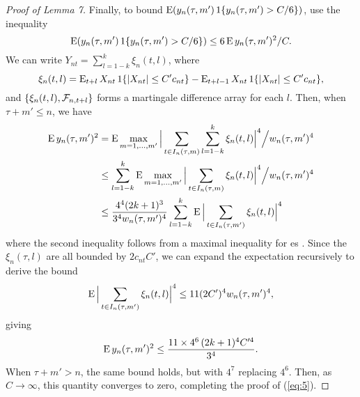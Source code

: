\documentclass[11pt]{article}
\begin{document}
{\begin{proof}[Proof of Lemma 7]
  Finally, to bound $\operatorname{E}(y_n(\tau,m') \operatorname{1}\{y_n(\tau, m') > C/6\})$,
  use the inequality
  \begin{equation*}
    \operatorname{E}(y_n(\tau,m') \operatorname{1}\{y_n(\tau, m') > C/6\})
    \leq 6 \operatorname{E} y_n(\tau, m')^2 / C.
  \end{equation*}
  We can write $Y_{nt} = \sum_{l=1-k}^k \xi_n(t,l)$, where
  \begin{equation*}
    \xi_n(t,l) = \operatorname{E}_{t+l} X_{nt} \operatorname{1}\{|X_{nt}| \leq C' c_{nt}\}
                 - \operatorname{E}_{t+l-1} X_{nt} \operatorname{1}\{|X_{nt}| \leq C' c_{nt}\},
  \end{equation*}
  and $\{\xi_n(t,l), \mathcal{F}_{n,t+l}\}$ forms a martingale difference
  array for each $l$. Then, when $\tau + m' \leq n$, we have
  \begin{align*}
    \operatorname{E} y_n(\tau, m')^2
    &= \operatorname{E} \max_{m = 1,\dots, m'}
    \Big| \sum_{t \in I_n(\tau, m)} \sum_{l=1-k}^k \xi_n(t,l) \Big|^4 \Big/ w_{n}(\tau, m')^4 \\
    &\leq \sum_{l=1-k}^k \operatorname{E} \max_{m = 1,\dots, m'}
    \Big| \sum_{t \in I_n(\tau, m)} \xi_n(t,l) \Big|^4 \Big/ w_{n}(\tau, m')^4 \\
    &\leq \frac{4^4 (2k + 1)^3}{3^4w_{n}(\tau, m')^4}
    \sum_{l=1-k}^k \operatorname{E} \Big| \sum_{t \in I_n(\tau, m')} \xi_n(t,l) \Big|^4
  \end{align*}
  where the second inequality follows from a maximal inequality for
  \mds es \citep[Theorem 16.8]{Dav:94}. Since the $\xi_n(\tau,l)$ are
  all bounded by $2 c_{nt} C'$, we can expand the expectation
  recursively to derive the bound
  \begin{equation*}
    \operatorname{E} \Big| \sum_{t \in I_n(\tau, m')} \xi_n(t,l) \Big|^4 \leq
    11 (2 C')^4 w_{n}(\tau, m')^4,
  \end{equation*}
  \citep[For details, see][Equations 16.69--16.72]{Dav:94}
  giving
  \begin{equation*}
    \operatorname{E} y_n(\tau, m')^2 \leq \frac{11 \times 4^6\, (2k + 1)^4 C^{\prime4}}{3^4}.
  \end{equation*}
  When $\tau + m' > n$, the same bound holds, but with $4^7$ replacing
  $4^6$.  Then, as $C \to \infty$, this quantity converges to zero,
  completing the proof of (\ref{eq:5}).
\end{proof}
}

\end{document}
